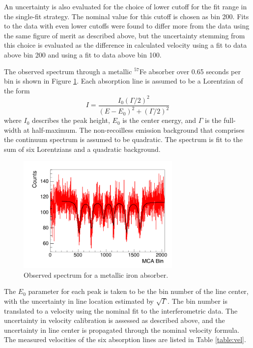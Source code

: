 An uncertainty is also evaluated for the choice of lower cutoff for the fit range in the single-fit strategy. The nominal value for this cutoff is chosen as bin 200. Fits to the data with even lower cutoffs were found to differ more from the data using the same figure of merit as described above, but the uncertainty stemming from this choice is evaluated as the difference in calculated velocity using a fit to data above bin 200 and using a fit to data above bin 100. 

The observed spectrum through a metallic $^{57}$Fe absorber over 0.65 seconds per bin is shown in Figure \ref{fig:metal}. Each absorption line is assumed to be a Lorentzian of the form
\begin{equation}
I = \frac{I_0 (\Gamma/2)^{2}}{(E - E_0)^{2}+(\Gamma/2)^2}
\label{eq:lor}
\end{equation}
where $I_0$ describes the peak height, $E_0$ is the center energy, and $\Gamma$ is the full-width at half-maximum. The non-recoilless emission background that comprises the continuum spectrum is assumed to be quadratic. The spectrum is fit to the sum of six Lorentzians and a quadratic background.

\begin{figure}[htb]
\includegraphics[width=8cm]{fePeaks.png}
\caption{Observed spectrum for a metallic iron absorber.}
\label{fig:metal}
\end{figure}

The $E_0$ parameter for each peak is taken to be the bin number of the line center, with the uncertainty in line location estimated by $\sqrt{\Gamma}$. The bin number is translated to a velocity using the nominal fit to the interferometric data. The uncertainty in velocity calibration is assessed as described above, and the uncertainty in line center is propagated through the nominal velocity formula. The measured velocities of the six absorption lines are listed in Table \ref{table:vel}. 

